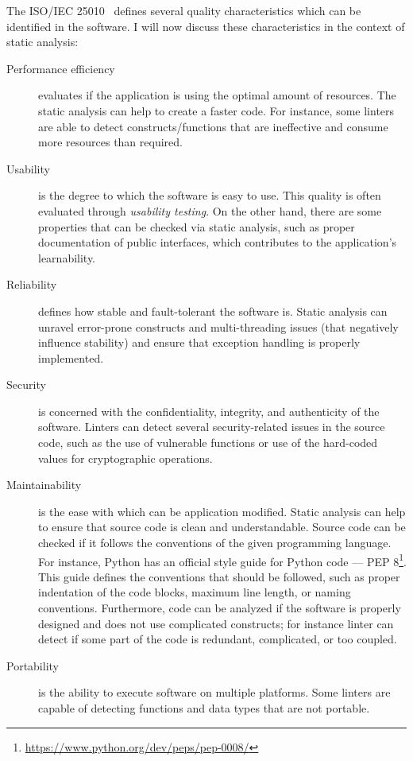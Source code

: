 \documentclass[digital,oneside,oldtable,nolof,nolot,nocover]{fithesis4}
\begin{document}
The ISO/IEC 25010~\cite{ISO25010} defines several quality characteristics which can be identified in the software.
I will now discuss these characteristics in the context of static analysis:
\begin{description}
\item[{Performance efficiency}] evaluates if the application is using the optimal amount of resources.
The static analysis can help to create a faster code.  For instance, some
linters are able to detect constructs/functions that are ineffective and
consume more resources than required.
\item[{Usability}] is the degree to which the software is easy to use. This quality is often evaluated through
\emph{usability testing}. On the other hand, there are some properties that can be checked via static analysis,
such as proper documentation of public interfaces, which contributes to the application's learnability.
\item[{Reliability}] defines how stable and fault-tolerant the software is.
Static analysis can unravel error-prone constructs and multi-threading issues
(that negatively influence stability) and ensure that exception handling is properly implemented.
\item[{Security}] is concerned with the confidentiality, integrity, and authenticity of the software.
Linters can detect several security-related issues in the source code, such as the use of vulnerable functions
or use of the hard-coded values for cryptographic operations.
\item[{Maintainability}] is the ease with which can be application modified.
Static analysis can help to ensure that source code is clean and
understandable.  Source code can be checked if it follows the conventions of
the given programming language. For instance, Python has an official style
guide for Python code --- PEP 8\footnote{\url{https://www.python.org/dev/peps/pep-0008/}}.
This guide defines the conventions that should be followed, such as proper
indentation of the code blocks, maximum line length, or naming conventions.
Furthermore, code can be analyzed if the software is properly designed and
does not use complicated constructs; for instance linter can detect if some
part of the code is redundant, complicated, or too coupled.
\item[{Portability}] is the ability to execute software on multiple platforms.
Some linters are capable of detecting functions and data types that are not portable.
\end{description}
\end{document}
